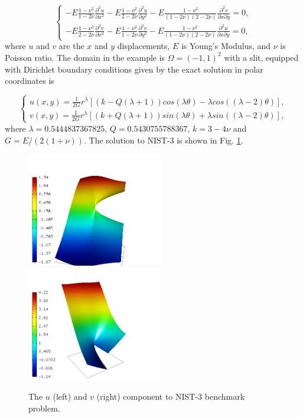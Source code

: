 \documentclass[12pt]{elsarticle}
\begin{document}
\begin{equation}\label{crack}
\left\{
\begin{array}{l}
\displaystyle
-E \frac{1-\nu^2}{1-2\nu} \frac{\partial^{2} u}{\partial x^{2}} - E\frac{1-\nu^2}{2-2 \nu} \frac{\partial^{2} u}{\partial y^{2}}
-E \frac{1-\nu^2}{(1-2\nu)(2-2\nu)} \frac{\partial^{2} v}{\partial x \partial y} = 0, \\[3mm]
\displaystyle
-E \frac{1-\nu^2}{2-2\nu} \frac{\partial^{2} v}{\partial x^{2}} - E\frac{1-\nu^2}{1-2\nu} \frac{\partial^{2} v}{\partial y^{2}}
-E \frac{1-\nu^2}{(1-2\nu)(2-2\nu)} \frac{\partial^{2} u}{\partial x \partial y} = 0,
\end{array}
\right.
\end{equation}
where $u$ and $v$ are the
$x$ and $y$ displacements, $E$ is Young's Modulus,
and $\nu$ is Poisson ratio.
The domain in the example is $\Omega = (-1, 1)^2$ with a slit,
equipped with Dirichlet boundary conditions given by the
exact solution in polar coordinates is

\[
\left\{
\begin{array}{l}
\displaystyle
u(x, y) = \frac{1}{2G} r^{\lambda}[(k - Q(\lambda + 1))cos(\lambda \theta) - \lambda cos((\lambda - 2) \theta)],  \\[3mm]
\displaystyle
v(x, y) = \frac{1}{2G} r^{\lambda}[(k + Q(\lambda + 1))sin(\lambda \theta) + \lambda sin((\lambda - 2) \theta)],
\end{array}
\right.
\]
where $\lambda = 0.5444837367825$, $Q = 0.5430755788367$,
$k = 3 - 4 \nu$ and $G = E / (2(1 + \nu))$.
The solution to NIST-3 is shown in Fig. \ref{fig:sln-nist03}.

\begin{figure}[H]
\centering
\includegraphics[height=5cm]{nist/nist-3/solution-u.png}\ \
\includegraphics[height=5cm]{nist/nist-3/solution-v.png}
\caption{The $u$ (left) and $v$ (right) component to NIST-3 benchmark problem.}
\label{fig:sln-nist03}
\end{figure}
\end{document}
